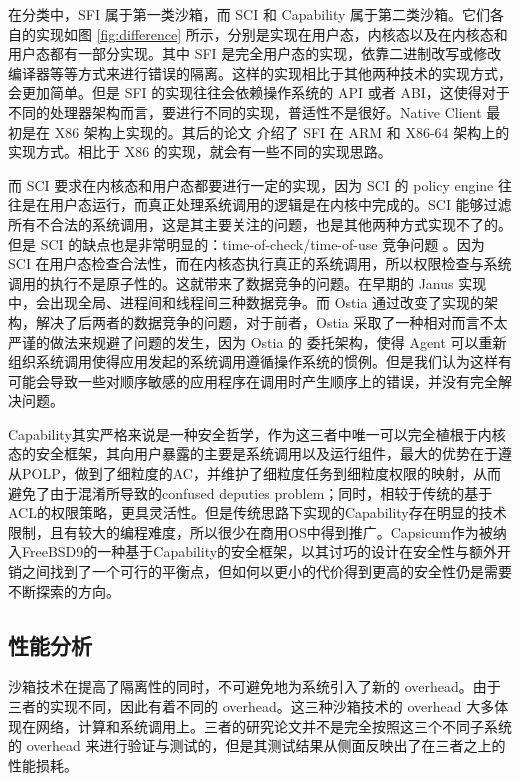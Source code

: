 \documentclass[final,5p,times]{elsarticle}
\begin{document}
在分类中，SFI 属于第一类沙箱，而 SCI 和 Capability 属于第二类沙箱。它们各自的实现如图 \ref{fig:difference} 所示，分别是实现在用户态，内核态以及在内核态和用户态都有一部分实现。其中 SFI 是完全用户态的实现，依靠二进制改写或修改编译器等等方式来进行错误的隔离。这样的实现相比于其他两种技术的实现方式，会更加简单。但是 SFI 的实现往往会依赖操作系统的 API 或者 ABI，这使得对于不同的处理器架构而言，要进行不同的实现，普适性不是很好。Native Client 最初是在 X86 架构上实现的。其后的论文 \cite{sehr2010adapting} 介绍了 SFI 在 ARM 和 X86-64 架构上的实现方式。相比于 X86 的实现，就会有一些不同的实现思路。

而 SCI 要求在内核态和用户态都要进行一定的实现，因为 SCI 的 policy engine 往往是在用户态运行，而真正处理系统调用的逻辑是在内核中完成的。SCI 能够过滤所有不合法的系统调用，这是其主要关注的问题，也是其他两种方式实现不了的。但是 SCI 的缺点也是非常明显的：time-of-check/time-of-use 竞争问题 \cite{bishop1996checking}。因为 SCI 在用户态检查合法性，而在内核态执行真正的系统调用，所以权限检查与系统调用的执行不是原子性的。这就带来了数据竞争的问题。在早期的 Janus 实现中，会出现全局、进程间和线程间三种数据竞争。而 Ostia 通过改变了实现的架构，解决了后两者的数据竞争的问题，对于前者，Ostia 采取了一种相对而言不太严谨的做法来规避了问题的发生，因为 Ostia 的 委托架构，使得 Agent 可以重新组织系统调用使得应用发起的系统调用遵循操作系统的惯例。但是我们认为这样有可能会导致一些对顺序敏感的应用程序在调用时产生顺序上的错误，并没有完全解决问题。

Capability其实严格来说是一种安全哲学，作为这三者中唯一可以完全植根于内核态的安全框架，其向用户暴露的主要是系统调用以及运行组件，最大的优势在于遵从POLP，做到了细粒度的AC，并维护了细粒度任务到细粒度权限的映射，从而避免了由于混淆所导致的confused deputies problem；同时，相较于传统的基于ACL的权限策略，更具灵活性。但是传统思路下实现的Capability存在明显的技术限制，且有较大的编程难度，所以很少在商用OS中得到推广。Capsicum作为被纳入FreeBSD9的一种基于Capability的安全框架，以其讨巧的设计在安全性与额外开销之间找到了一个可行的平衡点，但如何以更小的代价得到更高的安全性仍是需要不断探索的方向。

\subsection{性能分析}
\label{ss: analysis}

沙箱技术在提高了隔离性的同时，不可避免地为系统引入了新的 overhead。由于三者的实现不同，因此有着不同的 overhead。这三种沙箱技术的 overhead 大多体现在网络，计算和系统调用上。三者的研究论文并不是完全按照这三个不同子系统的 overhead 来进行验证与测试的，但是其测试结果从侧面反映出了在三者之上的性能损耗。
\end{document}
